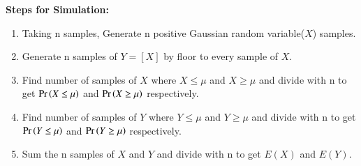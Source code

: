 \documentclass[journal,12pt,twocolumn]{IEEEtran}
\theoremstyle{remark}
\begin{document}
\textbf{Steps for Simulation:}
\begin{enumerate}
\item Taking n samples, Generate n positive Gaussian random variable($X$) samples.
\item Generate n samples of $Y=[X]$ by floor to every sample of $X$.
\item Find number of samples of $X$ where $X \leq \mu$ and $X \geq \mu$ and divide with n to get $\Pr\left(X \leq \mu\right)$ and $\Pr\left(X \geq \mu\right)$ respectively.
\item Find number of samples of $Y$ where $Y \leq \mu$ and $Y \geq \mu$ and divide with n to get $\Pr\left(Y \leq \mu\right)$ and $\Pr\left(Y \geq \mu\right)$ respectively.
\item Sum the n samples of $X$ and $Y$ and divide with n to get $E(X)$ and $E(Y)$.
\end{enumerate}
\end{document}
